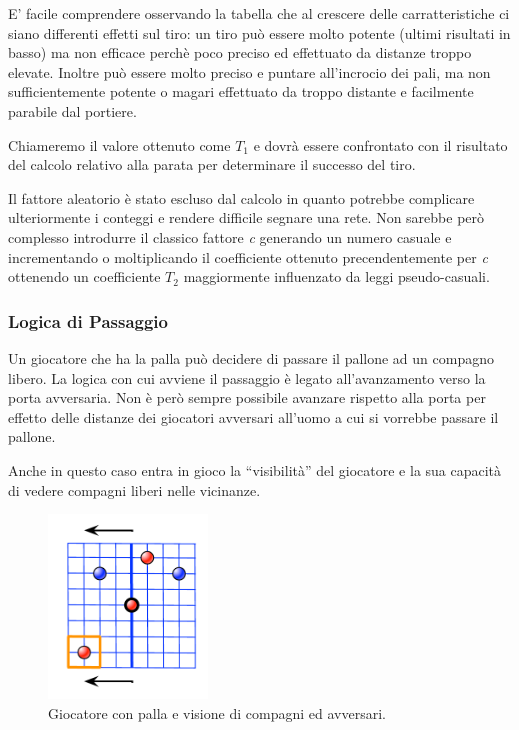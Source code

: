\documentclass[aps,letterpaper,10pt]{article}
\begin{document}
E' facile comprendere osservando la tabella che al crescere delle carratteristiche ci siano differenti effetti sul tiro: un tiro pu\`o essere molto potente (ultimi risultati in basso) ma non efficace perch\`e poco preciso ed effettuato da distanze troppo elevate. Inoltre pu\`o essere molto preciso e puntare all'incrocio dei pali, ma non sufficientemente potente o magari effettuato da troppo distante e facilmente parabile dal portiere. \vspace{3mm}

Chiameremo il valore ottenuto come $T_1$ e dovr\`a essere confrontato con il risultato del calcolo relativo alla parata per determinare il successo del tiro. \vspace{3mm}

Il fattore aleatorio \`e stato escluso dal calcolo in quanto potrebbe complicare ulteriormente i conteggi e rendere difficile segnare una rete. Non sarebbe per\`o complesso introdurre il classico fattore \emph{c} generando un numero casuale e incrementando o moltiplicando il coefficiente ottenuto precendentemente per \emph{c} ottenendo un coefficiente $T_2$ maggiormente influenzato da leggi pseudo-casuali.

\subsubsection{Logica di Passaggio}

Un giocatore che ha la palla pu\`o decidere di passare il pallone ad un compagno libero. La logica con cui avviene il passaggio \`e legato all'avanzamento verso la porta avversaria. Non \`e per\`o sempre possibile avanzare rispetto alla porta per effetto delle distanze dei giocatori avversari all'uomo a cui si vorrebbe passare il pallone. \vspace{3mm}

Anche in questo caso entra in gioco la ``visibilit\`a'' del giocatore e la sua capacit\`a di vedere compagni liberi nelle vicinanze. 

\begin{figure}[H]
	\begin{center}
		\includegraphics[width=160px]{images/vision2.pdf}
	\end{center}
\caption{Giocatore con palla e visione di compagni ed avversari.}
\end{figure}
\end{document}
